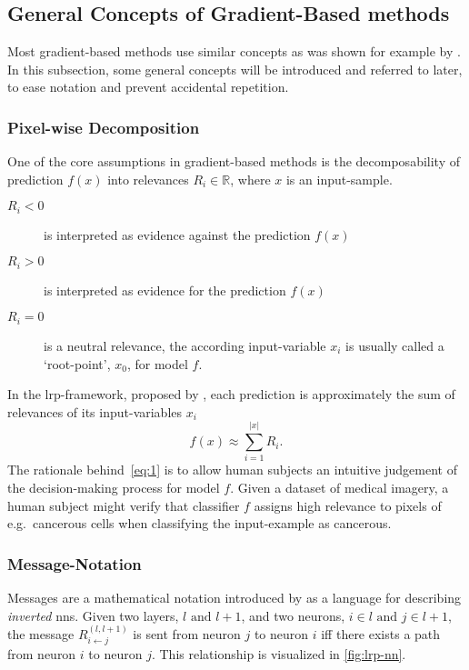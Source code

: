 \subsection{General Concepts of Gradient-Based methods}
Most gradient-based methods use similar concepts as was shown for example by . In this subsection, some general concepts will be introduced and referred to later, to ease notation and prevent accidental repetition.

\subsubsection{Pixel-wise Decomposition}\label{subsubsect:pixel-wise-decomp}
One of the core assumptions in gradient-based methods is the decomposability of prediction \(f(x)\) into relevances \(R_i \in \mathbb R\), where \(x\) is an input-sample. 
\begin{description}
    \item[\(R_i < 0\)] is interpreted as evidence against the prediction \(f(x)\)
    \item[\(R_i > 0\)] is interpreted as evidence for the prediction \(f(x)\)
    \item[\(R_i = 0\)] is a neutral relevance, the according input-variable \(x_i\) is usually called a `root-point'\cite{Bach.2015}, \(x_0\), for model \(f\).
\end{description}
In the \gls{lrp}-framework, proposed by , each prediction is approximately the sum of relevances of its input-variables \(x_i\)
\begin{equation}
    f(x) \approx \sum_{i=1}^{|x|} R_i.\label{eq:1}
\end{equation}
The rationale behind~\cref{eq:1} is to allow human subjects an intuitive judgement of the decision-making process for model \(f\). Given a dataset of medical imagery, a human subject might verify that classifier \(f\) assigns high relevance to pixels of e.g.\ cancerous cells when classifying the input-example as cancerous.

\subsubsection{Message-Notation}\label{subsubsect:message-notation}
Messages are a mathematical notation introduced by  as a language for describing \textit{inverted} \glspl{nn}. Given two layers, \(l \text{ and } l+1\), and two neurons, \(i\in l \text{ and } j\in l+1\), the message \(R_{i\leftarrow j}^{(l, l+1)}\) is sent from neuron \(j\) to neuron \(i\) iff there exists a \gls{path} from neuron \(i\) to neuron \(j\). This relationship is visualized in \cref{fig:lrp-nn}.